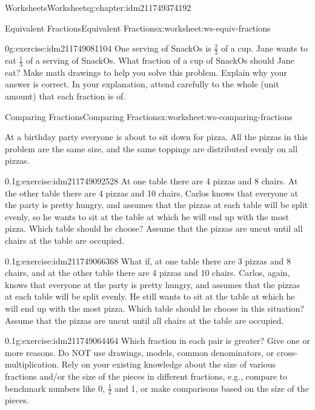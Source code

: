 \documentclass[twoside,11pt,]{book}
\begin{document}
\begin{chapterptx}{Worksheets}{}{Worksheets}{}{}{g:chapter:idm211749374192}
\begin{worksheet-section-numberless}{Equivalent Fractions}{}{Equivalent Fractions}{}{}{x:worksheet:ws-equiv-fractions}
\begin{divisionexercise}{5}{}{0}{g:exercise:idm211749081104}%
One serving of SnackOs is \(\frac{2}{3} \) of a cup. Jane wants to eat \(\frac{1}{3} \) of a serving of SnackOs. What fraction of a cup of SnackOs should Jane eat? Make math drawings to help you solve this problem. Explain why your answer is correct. In your explanation, attend carefully to the whole (unit amount) that each fraction is of.%
\end{divisionexercise}%
\end{worksheet-section-numberless}
\restoregeometry
%
%
\typeout{************************************************}
\typeout{************************************************}
%
\begin{worksheet-section-numberless}{Comparing Fractions}{}{Comparing Fractions}{}{}{x:worksheet:ws-comparing-fractions}
\begin{introduction}{}%
At a birthday party everyone is about to sit down for pizza.  All the pizzas in this problem are the same size, and the same toppings are distributed evenly on all pizzas.%
\end{introduction}%
\begin{divisionexercise}{1}{}{0.1}{g:exercise:idm211749092528}%
At one table there are 4 pizzas and 8 chairs.  At the other table there are 4 pizzas and 10 chairs.  Carlos knows that everyone at the party is pretty hungry, and assumes that the pizzas at each table will be split evenly, so he wants to sit at the table at which he will end up with the most pizza.  Which table should he choose?  Assume that the pizzas are uncut until all chairs at the table are occupied.%
\end{divisionexercise}%
\begin{divisionexercise}{2}{}{0.1}{g:exercise:idm211749066368}%
What if, at one table there are 3 pizzas and 8 chairs, and at the other table there are 4 pizzas and 10 chairs.  Carlos, again, knows that everyone at the party is pretty hungry, and assumes that the pizzas at each table will be split evenly.  He still wants to sit at the table at which he will end up with the most pizza.  Which table should he choose in this situation? Assume that the pizzas are uncut until all chairs at the table are occupied.%
\end{divisionexercise}%
\begin{divisionexercise}{3}{}{0.1}{g:exercise:idm211749064464}%
Which fraction in each pair is greater?  Give one or more reasons.  Do NOT use drawings, models, common denominators, or cross-multiplication.  Rely on your existing knowledge about the size of various fractions and\slash{}or the size of the pieces in different fractions, e.g., compare to benchmark numbers like 0, \(\frac{1}{2} \) and 1, or make comparisons based on the size of the pieces.%

\end{divisionexercise}
\end{worksheet-section-numberless}
\end{chapterptx}
\end{document}
